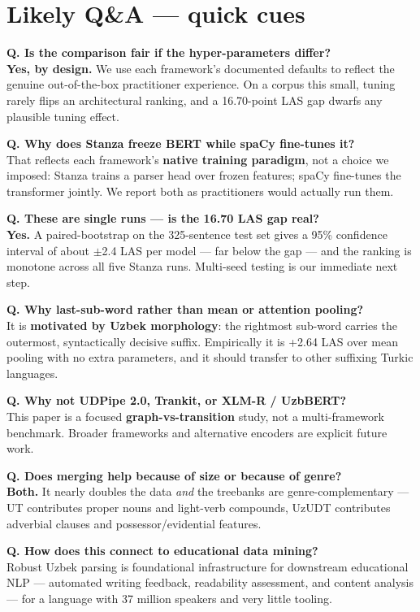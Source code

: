 \documentclass[12pt,a4paper]{article}
\begin{document}
\section*{Likely Q\&A --- quick cues}

\noindent\textbf{Q. Is the comparison fair if the hyper-parameters differ?}\\
\textbf{Yes, by design.} We use each framework's documented defaults to
reflect the genuine out-of-the-box practitioner experience. On a corpus
this small, tuning rarely flips an architectural ranking, and a
16.70-point LAS gap dwarfs any plausible tuning effect.

\vspace{0.4em}
\noindent\textbf{Q. Why does Stanza freeze BERT while spaCy fine-tunes it?}\\
That reflects each framework's \textbf{native training paradigm}, not a
choice we imposed: Stanza trains a parser head over frozen features;
spaCy fine-tunes the transformer jointly. We report both as practitioners
would actually run them.

\vspace{0.4em}
\noindent\textbf{Q. These are single runs --- is the 16.70 LAS gap real?}\\
\textbf{Yes.} A paired-bootstrap on the 325-sentence test set gives a
95\% confidence interval of about $\pm$2.4 LAS per model --- far below the
gap --- and the ranking is monotone across all five Stanza runs.
Multi-seed testing is our immediate next step.

\vspace{0.4em}
\noindent\textbf{Q. Why last-sub-word rather than mean or attention pooling?}\\
It is \textbf{motivated by Uzbek morphology}: the rightmost sub-word
carries the outermost, syntactically decisive suffix. Empirically it is
+2.64 LAS over mean pooling with no extra parameters, and it should
transfer to other suffixing Turkic languages.

\vspace{0.4em}
\noindent\textbf{Q. Why not UDPipe 2.0, Trankit, or XLM-R / UzbBERT?}\\
This paper is a focused \textbf{graph-vs-transition} study, not a
multi-framework benchmark. Broader frameworks and alternative encoders
are explicit future work.

\vspace{0.4em}
\noindent\textbf{Q. Does merging help because of size or because of genre?}\\
\textbf{Both.} It nearly doubles the data \emph{and} the treebanks are
genre-complementary --- UT contributes proper nouns and light-verb
compounds, UzUDT contributes adverbial clauses and possessor/evidential
features.

\vspace{0.4em}
\noindent\textbf{Q. How does this connect to educational data mining?}\\
Robust Uzbek parsing is foundational infrastructure for downstream
educational NLP --- automated writing feedback, readability assessment,
and content analysis --- for a language with 37 million speakers and very
little tooling.
\end{document}
